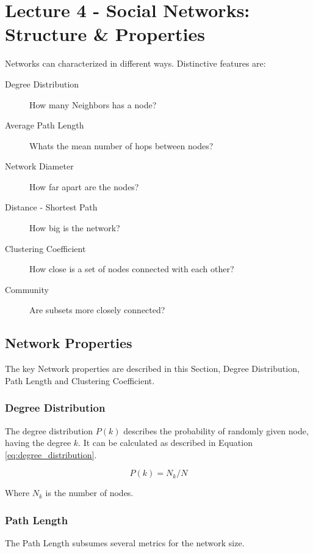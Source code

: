 \section{Lecture 4 - Social Networks: Structure \& Properties} %
\label{sec:social_networks_structure_&_properties}

Networks can characterized in different ways.
Distinctive features are:\\
\begin{description}
	\item[Degree Distribution] How many Neighbors has a node?
	\item[Average Path Length] Whats the mean number of hops between nodes?
	\item[Network Diameter] How far apart are the nodes?
	\item[Distance - Shortest Path] How big is the network?
	\item[Clustering Coefficient] How close is a set of nodes connected with each other?
	\item[Community] Are subsets more closely connected?
\end{description}

\subsection{Network Properties} %
\label{sub:network_properties}
	The key Network properties are described in this Section,
	Degree Distribution, Path Length and Clustering Coefficient.

	\subsubsection{Degree Distribution} %
	\label{ssub:degree_distribution}
	The degree distribution $P(k)$ describes the probability of randomly given node,
	having the degree $k$.
	It can be calculated as described in Equation \ref{eq:degree_distribution}.

	\begin{equation}
	\label{eq:degree_distribution}
		P(k) = N_k / N
	\end{equation}

	Where $N_k$ is the number of nodes.

	\subsubsection{Path Length} %
	\label{ssub:path_length}
		The Path Length subsumes several metrics for the network size.
